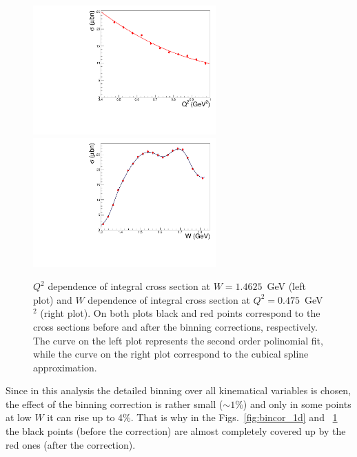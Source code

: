 \begin{figure}[htp]
\begin{center}
\includegraphics[width=7cm]{pictures/bin_corr/q2_fit.pdf}
\includegraphics[width=7cm]{pictures/bin_corr/w_spline.pdf}
\caption{\small $Q^{2}$ dependence of integral cross section at $W = 1.4625$~GeV (left plot) and $W$ dependence of integral cross section at $Q^{2} = 0.475$~GeV$^{2}$ (right plot). On both plots black and red points correspond to the cross sections before and after the binning corrections, respectively. The curve on the left plot represents the second order polinomial fit, while the curve on the right plot correspond to the cubical spline approximation.} \label{fig:bincor_w_q2}
\end{center}
\end{figure}

Since in this analysis the detailed binning over all kinematical variables is chosen, the effect of the binning correction is rather small ($\sim 1\%$) and only in some points at low $W$ it can rise up to 4\%. That is why in the Figs.~\ref{fig:bincor_1d} and ~\ref{fig:bincor_w_q2} the black points (before the correction) are almost completely covered up by the red ones (after the correction).
